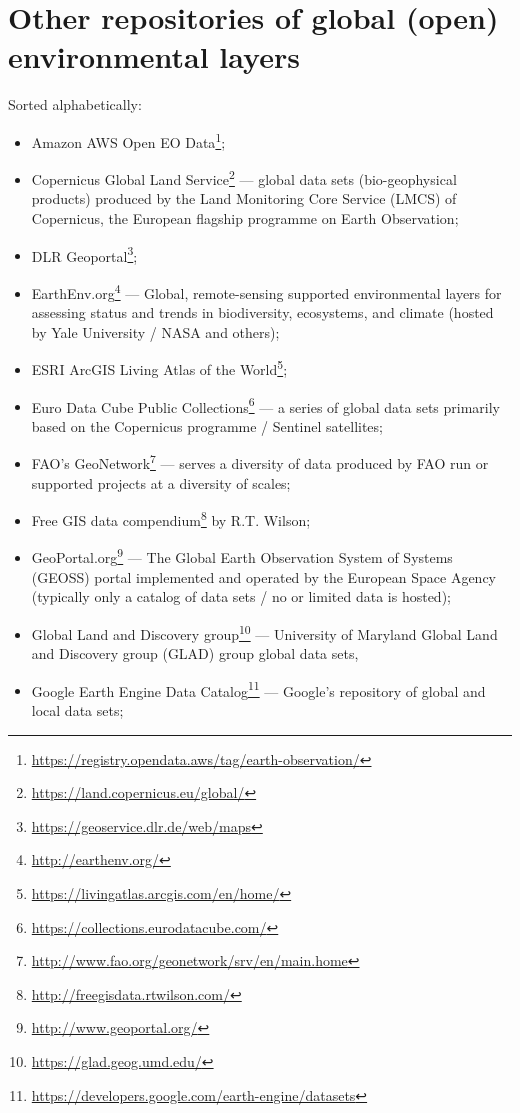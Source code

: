 \documentclass[
  graybox,natbib,nospthms]{svmono}
\providecommand{\tightlist}{%
  \setlength{\itemsep}{0pt}\setlength{\parskip}{0pt}}
\providecommand{\tightlist}{\setlength{\itemsep}{0pt}\setlength{\parskip}{0pt}}
\renewcommand{\href}[2]{#2 (\url{#1})}
\renewcommand{\href}[2]{#2\footnote{\url{#1}}}
\begin{document}
\hypertarget{other-repositories-of-global-open-environmental-layers}{%
\section{Other repositories of global (open) environmental layers}\label{other-repositories-of-global-open-environmental-layers}}

Sorted alphabetically:

\begin{itemize}
\tightlist
\item
  \href{https://registry.opendata.aws/tag/earth-observation/}{Amazon AWS Open EO Data};
\item
  \href{https://land.copernicus.eu/global/}{Copernicus Global Land Service} --- global data sets (bio-geophysical products) produced by the Land Monitoring Core Service (LMCS) of Copernicus, the European flagship programme on Earth Observation;
\item
  \href{https://geoservice.dlr.de/web/maps}{DLR Geoportal};
\item
  \href{http://earthenv.org/}{EarthEnv.org} --- Global, remote-sensing supported environmental layers for assessing status and trends in biodiversity, ecosystems, and climate (hosted by Yale University / NASA and others);
\item
  \href{https://livingatlas.arcgis.com/en/home/}{ESRI ArcGIS Living Atlas of the World};
\item
  \href{https://collections.eurodatacube.com/}{Euro Data Cube Public Collections} --- a series of global data sets primarily based on the Copernicus programme / Sentinel satellites;
\item
  \href{http://www.fao.org/geonetwork/srv/en/main.home}{FAO's GeoNetwork} --- serves a diversity of data produced by FAO run or supported projects at a diversity of scales;
\item
  \href{http://freegisdata.rtwilson.com/}{Free GIS data compendium} by R.T. Wilson;
\item
  \href{http://www.geoportal.org/}{GeoPortal.org} --- The Global Earth Observation System of Systems (GEOSS) portal implemented and operated by the European Space Agency (typically only a catalog of data sets / no or limited data is hosted);
\item
  \href{https://glad.geog.umd.edu/}{Global Land and Discovery group} --- University of Maryland Global Land and Discovery group (GLAD) group global data sets,
\item
  \href{https://developers.google.com/earth-engine/datasets}{Google Earth Engine Data Catalog} --- Google's repository of global and local data sets;

\end{itemize}
\end{document}
